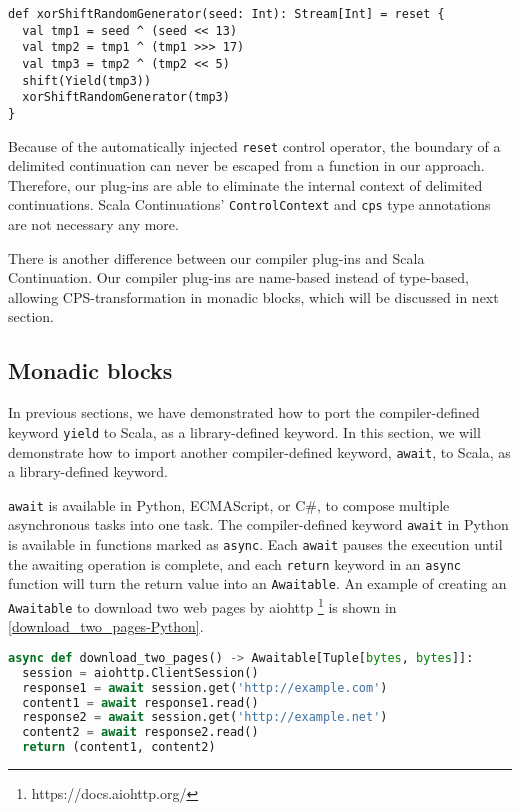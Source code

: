 \begin{lstlisting}[caption={TheXorshift pseudo-random number generator,  in Scala Continuations},label={xorShiftRandomGenerator-scala-continuations}]
def xorShiftRandomGenerator(seed: Int): Stream[Int] = reset {
  val tmp1 = seed ^ (seed << 13)
  val tmp2 = tmp1 ^ (tmp1 >>> 17)
  val tmp3 = tmp2 ^ (tmp2 << 5)
  shift(Yield(tmp3))
  xorShiftRandomGenerator(tmp3)
}
\end{lstlisting}

Because of the automatically injected \lstinline{reset} control operator, the boundary of a delimited continuation can never be escaped from a function in our approach. Therefore, our plug-ins are able to eliminate the internal context of delimited continuations. Scala Continuations' \lstinline{ControlContext} and \lstinline{cps} type annotations are not necessary any more.

There is another difference between our compiler plug-ins and Scala Continuation. Our compiler plug-ins are name-based instead of type-based, allowing CPS-transformation in monadic blocks, which will be discussed in next section.

\subsection{Monadic blocks}\label{Monadic blocks}

In previous sections, we have demonstrated how to port the compiler-defined keyword \lstinline{yield} to Scala, as a library-defined keyword. In this section, we will demonstrate how to import another compiler-defined keyword, \lstinline{await}, to Scala, as a library-defined keyword.

\lstinline{await} is available in Python, ECMAScript, or C\#, to compose multiple asynchronous tasks into one task. The compiler-defined keyword \lstinline{await} in Python is available in functions marked as \lstinline{async}. Each \lstinline{await} pauses the execution until the awaiting operation is complete, and each \lstinline{return} keyword in an \lstinline{async} function will turn the return value into an \lstinline{Awaitable}. An example of creating an \lstinline{Awaitable} to download two web pages by aiohttp \footnote{https://docs.aiohttp.org/} is shown in \cref{download_two_pages-Python}.

\begin{lstlisting}[language=Python,style=Python3,caption={Asynchronously downloading two web pages in Python},label={download_two_pages-Python}]
async def download_two_pages() -> Awaitable[Tuple[bytes, bytes]]:
  session = aiohttp.ClientSession()
  response1 = await session.get('http://example.com')
  content1 = await response1.read()
  response2 = await session.get('http://example.net')
  content2 = await response2.read()
  return (content1, content2)
\end{lstlisting}

